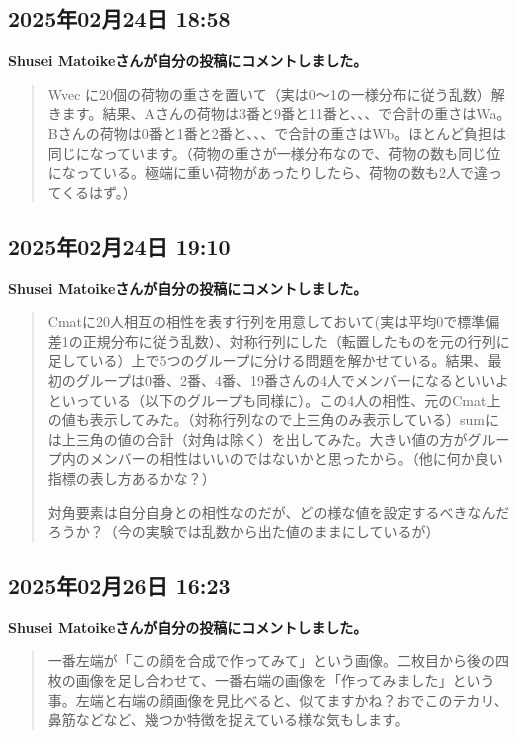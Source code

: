 \subsection*{2025年02月24日 18:58}

\textbf{Shusei Matoikeさんが自分の投稿にコメントしました。}

\begin{quote}
Wvec に20個の荷物の重さを置いて（実は0〜1の一様分布に従う乱数）解きます。結果、Aさんの荷物は3番と9番と11番と、、、で合計の重さはWa。Bさんの荷物は0番と1番と2番と、、、で合計の重さはWb。ほとんど負担は同じになっています。（荷物の重さが一様分布なので、荷物の数も同じ位になっている。極端に重い荷物があったりしたら、荷物の数も2人で違ってくるはず。）
\end{quote}

\subsection*{2025年02月24日 19:10}

\textbf{Shusei Matoikeさんが自分の投稿にコメントしました。}

\begin{quote}
Cmatに20人相互の相性を表す行列を用意しておいて(実は平均0で標準偏差1の正規分布に従う乱数）、対称行列にした（転置したものを元の行列に足している）上で5つのグループに分ける問題を解かせている。結果、最初のグループは0番、2番、4番、19番さんの4人でメンバーになるといいよといっている（以下のグループも同様に）。この4人の相性、元のCmat上の値も表示してみた。（対称行列なので上三角のみ表示している）sumには上三角の値の合計（対角は除く）を出してみた。大きい値の方がグループ内のメンバーの相性はいいのではないかと思ったから。（他に何か良い指標の表し方あるかな？）

対角要素は自分自身との相性なのだが、どの様な値を設定するべきなんだろうか？（今の実験では乱数から出た値のままにしているが）
\end{quote}

\subsection*{2025年02月26日 16:23}

\textbf{Shusei Matoikeさんが自分の投稿にコメントしました。}

\begin{quote}
一番左端が「この顔を合成で作ってみて」という画像。二枚目から後の四枚の画像を足し合わせて、一番右端の画像を「作ってみました」という事。左端と右端の顔画像を見比べると、似てますかね？おでこのテカリ、鼻筋などなど、幾つか特徴を捉えている様な気もします。
\end{quote}

